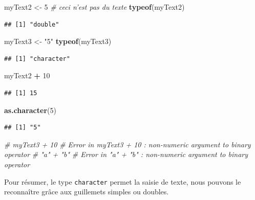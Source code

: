 \documentclass[
]{book}
\newenvironment{Shaded}{\begin{snugshade}}{\end{snugshade}}
\newcommand{\CommentTok}[1]{\textcolor[rgb]{0.56,0.35,0.01}{\textit{#1}}}
\newcommand{\DecValTok}[1]{\textcolor[rgb]{0.00,0.00,0.81}{#1}}
\newcommand{\KeywordTok}[1]{\textcolor[rgb]{0.13,0.29,0.53}{\textbf{#1}}}
\newcommand{\NormalTok}[1]{#1}
\newcommand{\OperatorTok}[1]{\textcolor[rgb]{0.81,0.36,0.00}{\textbf{#1}}}
\newcommand{\StringTok}[1]{\textcolor[rgb]{0.31,0.60,0.02}{#1}}
\begin{document}
\begin{Shaded}
\begin{Highlighting}[]
\NormalTok{myText2 <-}\StringTok{ }\DecValTok{5} \CommentTok{# ceci n'est pas du texte}
\KeywordTok{typeof}\NormalTok{(myText2)}
\end{Highlighting}
\end{Shaded}

\begin{verbatim}
## [1] "double"
\end{verbatim}

\begin{Shaded}
\begin{Highlighting}[]
\NormalTok{myText3 <-}\StringTok{ "5"}
\KeywordTok{typeof}\NormalTok{(myText3)}
\end{Highlighting}
\end{Shaded}

\begin{verbatim}
## [1] "character"
\end{verbatim}

\begin{Shaded}
\begin{Highlighting}[]
\NormalTok{myText2 }\OperatorTok{+}\StringTok{ }\DecValTok{10}
\end{Highlighting}
\end{Shaded}

\begin{verbatim}
## [1] 15
\end{verbatim}

\begin{Shaded}
\begin{Highlighting}[]
\KeywordTok{as.character}\NormalTok{(}\DecValTok{5}\NormalTok{)}
\end{Highlighting}
\end{Shaded}

\begin{verbatim}
## [1] "5"
\end{verbatim}

\begin{Shaded}
\begin{Highlighting}[]
\CommentTok{# myText3 + 10 }
\CommentTok{# Error in myText3 + 10 : non-numeric argument to binary operator}
\CommentTok{# "a" + "b" }
\CommentTok{# Error in "a" + "b" : non-numeric argument to binary operator}
\end{Highlighting}
\end{Shaded}

Pour résumer, le type \texttt{character} permet la saisie de texte, nous pouvons le reconnaître grâce aux guillemets simples ou doubles.
\end{document}
